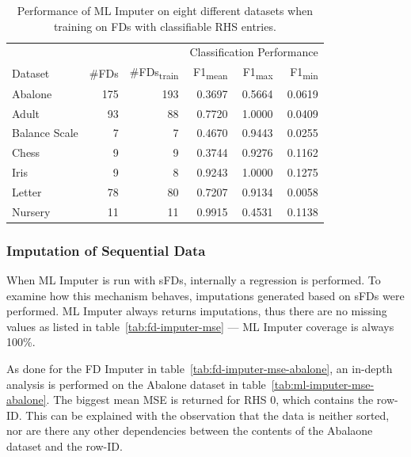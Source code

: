 \begin{table}[ht]
    \centering
    \begin{tabular}{lrrrrr}
        \toprule
        \toprule
        & & & \multicolumn{3}{c}{Classification Performance} \\
        \cmidrule(lr{.25em}){4-6}
        Dataset & \#FDs & \#FDs\textsubscript{train} & F1\textsubscript{mean} & F1\textsubscript{max} & F1\textsubscript{min} \\
        \midrule
        Abalone & 175 & 193 & 0.3697 & 0.5664 & 0.0619 \\
        Adult & 93 & 88 & 0.7720 & 1.0000 & 0.0409 \\
        Balance Scale & 7 & 7 & 0.4670 & 0.9443 & 0.0255 \\
        Chess & 9 & 9 & 0.3744 & 0.9276 & 0.1162 \\
        Iris & 9 & 8 & 0.9243 & 1.0000 & 0.1275 \\
        Letter & 78 & 80 & 0.7207 & 0.9134 & 0.0058 \\
        Nursery & 11 & 11 & 0.9915 & 0.4531 & 0.1138 \\
        \bottomrule
        \bottomrule
    \end{tabular}
    \caption{Performance of ML Imputer on eight different datasets when training on FDs with classifiable RHS entries.}\label{tab:ml-imputer-performance}
\end{table}

\subsubsection{Imputation of Sequential Data}
When ML Imputer is run with sFDs, internally a regression is performed.
To examine how this mechanism behaves, imputations generated based on sFDs were performed.
ML Imputer always returns imputations, thus there are no missing values as listed in table~\ref{tab:fd-imputer-mse} --- ML Imputer coverage is always 100\%.

As done for the FD Imputer in table~\ref{tab:fd-imputer-mse-abalone}, an in-depth analysis is performed on the Abalone dataset in table~\ref{tab:ml-imputer-mse-abalone}.
The biggest mean MSE is returned for RHS 0, which contains the row-ID.
This can be explained with the observation that the data is neither sorted, nor are there any other dependencies between the contents of the Abalaone dataset and the row-ID.

